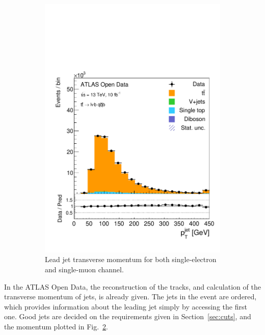 \documentclass[12pt,a4paper]{article}
\numberwithin{equation}{section}
\begin{document}
\begin{figure}[t!]
\begin{subfigure}[t]{0.47\textwidth}
      \includegraphics[width=1.0\textwidth]{figures/hist_leadjet_pt}
      \caption{\label{fig:jetpt}Lead jet transverse momentum for both
        single-electron and single-muon channel.}
    \end{subfigure}
    \caption{}
\end{figure}

In the ATLAS Open Data, the reconstruction of the tracks, and calculation of the
transverse momentum of jets, is already given. The jets in the event are
ordered, which provides information about the leading jet simply by accessing
the first one. Good jets are decided on the requirements given in
Section~\ref{sec:cuts}, and the momentum plotted in
Fig.~\ref{fig:jetpt}. \\%
\end{document}
